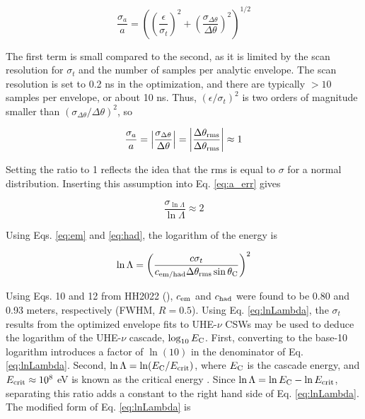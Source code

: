 \documentclass[amsmath,amssymb,aps,prd,10pt,twocolumn,showkeys]{revtex4}
\begin{document}
\begin{itemize}
\begin{equation}
\frac{\sigma_a}{a} = \left(\left(\frac{\epsilon}{\sigma_t}\right)^2 +  \left(\frac{\sigma_{\Delta\theta}}{\Delta\theta}\right)^2\right)^{1/2}
\end{equation}

The first term is small compared to the second, as it is limited by the scan resolution for $\sigma_t$ and the number of samples per analytic envelope.  The scan resolution is set to 0.2 ns in the optimization, and there are typically $>10$ samples per envelope, or about 10 ns.  Thus, $\left(\epsilon/\sigma_t\right)^2$ is two orders of magnitude smaller than $\left(\sigma_{\Delta\theta}/\Delta\theta\right)^2$, so

\begin{equation}
\frac{\sigma_a}{a} = \left|\frac{\sigma_{\Delta\theta}}{\Delta\theta}\right| = \left|\frac{\Delta\theta_{\rm rms}}{\Delta\theta_{\rm rms}}\right|\approx 1
\end{equation}

Setting the ratio to 1 reflects the idea that the rms is equal to $\sigma$ for a normal distribution.  Inserting this assumption into Eq. \ref{eq:a_err} gives

\begin{equation}
\frac{\sigma_{\ln\Lambda}}{\ln\Lambda} \approx 2 \label{eq:a_err_2}
\end{equation}

Using Eqs. \ref{eq:em} and \ref{eq:had}, the logarithm of the energy is

\begin{equation}
\ln\Lambda = \left( \frac{c\sigma_t}{c_{\rm em/had} \Delta\theta_{\rm rms}\sin\theta_{\rm C}} \right)^2 \label{eq:lnLambda}
\end{equation}

Using Eqs. 10 and 12 from HH2022 (\cite{PhysRevD.105.123019}), $c_{\rm em}$ and $c_{\rm had}$ were found to be 0.80 and 0.93 meters, respectively (FWHM, $R=0.5$).  Using Eq. \ref{eq:lnLambda}, the $\sigma_t$ results from the optimized envelope fits to UHE-$\nu$ CSWs may be used to deduce the logarithm of the UHE-$\nu$ cascade, $\log_{10} E_{\rm C}$.  First, converting to the base-10 logarithm introduces a factor of $\ln(10)$ in the denominator of Eq. \ref{eq:lnLambda}.  Second, $\ln\Lambda = \ln(E_{\rm C}/E_{\rm crit})$, where $E_{\rm C}$ is the cascade energy, and $E_{\rm crit}\approx 10^8$ eV is known as the critical energy \cite{PhysRevD.105.123019}.  Since $\ln\Lambda = \ln E_{\rm C} - \ln E_{\rm crit}$, separating this ratio adds a constant to the right hand side of Eq. \ref{eq:lnLambda}.  The modified form of Eq. \ref{eq:lnLambda} is


\end{itemize}
\end{document}
